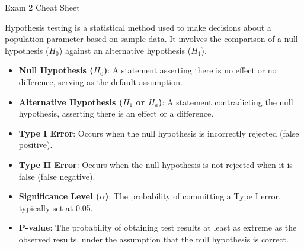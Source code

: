 \begin{cheatsheet}{Exam 2 Cheat Sheet}
{        Hypothesis testing is a statistical method used to make decisions about a population parameter based on sample data. It involves the comparison of a null hypothesis ($H_0$) against an alternative 
        hypothesis ($H_1$).
    
        \begin{itemize}
            \item \textbf{Null Hypothesis ($H_0$)}: A statement asserting there is no effect or no difference, serving as the default assumption.
            \item \textbf{Alternative Hypothesis ($H_1$ or $H_a$)}: A statement contradicting the null hypothesis, asserting there is an effect or a difference.
            \item \textbf{Type I Error}: Occurs when the null hypothesis is incorrectly rejected (false positive).
            \item \textbf{Type II Error}: Occurs when the null hypothesis is not rejected when it is false (false negative).
            \item \textbf{Significance Level ($\alpha$)}: The probability of committing a Type I error, typically set at 0.05.
            \item \textbf{P-value}: The probability of obtaining test results at least as extreme as the observed results, under the assumption that the null hypothesis is correct.
        \end{itemize}
    } \normalsize
\end{cheatsheet}